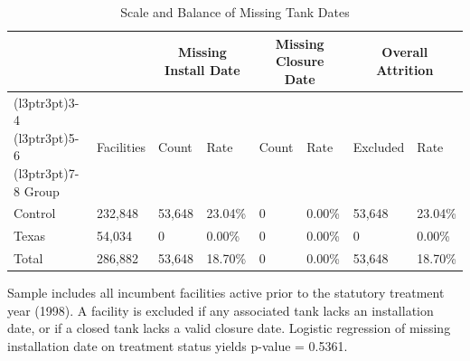 \begin{table}[H]
\centering
\caption{\label{tab:tab:missing-unified}Scale and Balance of Missing Tank Dates \label{tab:missing_unified}}
\centering
\fontsize{10}{12}\selectfont
\begin{threeparttable}
\begin{tabular}[t]{llllllll}
\toprule
\multicolumn{2}{c}{ } & \multicolumn{2}{c}{Missing Install Date} & \multicolumn{2}{c}{Missing Closure Date} & \multicolumn{2}{c}{Overall Attrition} \\
\cmidrule(l{3pt}r{3pt}){3-4} \cmidrule(l{3pt}r{3pt}){5-6} \cmidrule(l{3pt}r{3pt}){7-8}
Group & Facilities & Count & Rate & Count & Rate & Excluded & Rate\\
\midrule
Control & 232,848 & 53,648 & 23.04\% & 0 & 0.00\% & 53,648 & 23.04\%\\
Texas & 54,034 & 0 & 0.00\% & 0 & 0.00\% & 0 & 0.00\%\\
\midrule
Total & 286,882 & 53,648 & 18.70\% & 0 & 0.00\% & 53,648 & 18.70\%\\
\bottomrule
\end{tabular}
\begin{tablenotes}
\item Sample includes all incumbent facilities active prior to the statutory treatment year (1998). A facility is excluded if any associated tank lacks an installation date, or if a closed tank lacks a valid closure date. Logistic regression of missing installation date on treatment status yields p-value = 0.5361.
\end{tablenotes}
\end{threeparttable}
\end{table}
